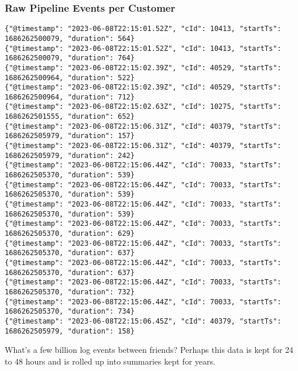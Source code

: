 \begin{frame}[fragile]
    \frametitle{Raw Pipeline Events per Customer}

\begin{lstlisting}
{"@timestamp": "2023-06-08T22:15:01.52Z", "cId": 10413, "startTs": 1686262500079, "duration": 564}
{"@timestamp": "2023-06-08T22:15:01.52Z", "cId": 10413, "startTs": 1686262500079, "duration": 764}
{"@timestamp": "2023-06-08T22:15:02.39Z", "cId": 40529, "startTs": 1686262500964, "duration": 522}
{"@timestamp": "2023-06-08T22:15:02.39Z", "cId": 40529, "startTs": 1686262500964, "duration": 712}
{"@timestamp": "2023-06-08T22:15:02.63Z", "cId": 10275, "startTs": 1686262501555, "duration": 652}
{"@timestamp": "2023-06-08T22:15:06.31Z", "cId": 40379, "startTs": 1686262505979, "duration": 157}
{"@timestamp": "2023-06-08T22:15:06.31Z", "cId": 40379, "startTs": 1686262505979, "duration": 242}
{"@timestamp": "2023-06-08T22:15:06.44Z", "cId": 70033, "startTs": 1686262505370, "duration": 539}
{"@timestamp": "2023-06-08T22:15:06.44Z", "cId": 70033, "startTs": 1686262505370, "duration": 539}
{"@timestamp": "2023-06-08T22:15:06.44Z", "cId": 70033, "startTs": 1686262505370, "duration": 539}
{"@timestamp": "2023-06-08T22:15:06.44Z", "cId": 70033, "startTs": 1686262505370, "duration": 629}
{"@timestamp": "2023-06-08T22:15:06.44Z", "cId": 70033, "startTs": 1686262505370, "duration": 637}
{"@timestamp": "2023-06-08T22:15:06.44Z", "cId": 70033, "startTs": 1686262505370, "duration": 637}
{"@timestamp": "2023-06-08T22:15:06.44Z", "cId": 70033, "startTs": 1686262505370, "duration": 732}
{"@timestamp": "2023-06-08T22:15:06.44Z", "cId": 70033, "startTs": 1686262505370, "duration": 734}
{"@timestamp": "2023-06-08T22:15:06.45Z", "cId": 40379, "startTs": 1686262505979, "duration": 158}
\end{lstlisting}

What's a few billion log events between friends?  Perhaps this data is kept
for 24 to 48 hours and is rolled up into summaries kept for years.

\end{frame}

